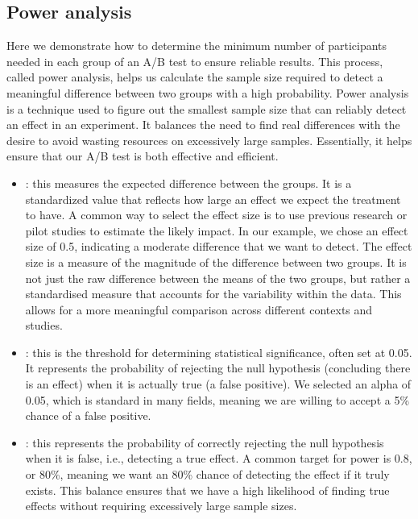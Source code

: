 \documentclass[letterpaper,10pt,english]{jupyterBook}
\begin{document}
\subsection{Power analysis}
\label{\detokenize{notebooks/AB_testing:power-analysis}}
\sphinxAtStartPar
Here we demonstrate how to determine the minimum number of participants needed in each group of an A/B test to ensure reliable results. This process, called power analysis, helps us calculate the sample size required to detect a meaningful difference between two groups with a high probability. Power analysis is a technique used to figure out the smallest sample size that can reliably detect an effect in an experiment. It balances the need to find real differences with the desire to avoid wasting resources on excessively large samples. Essentially, it helps ensure that our A/B test is both effective and efficient.

\sphinxAtStartPar
{}
\begin{itemize}
\item {} 
\sphinxAtStartPar
{}: this measures the expected difference between the groups. It is a standardized value that reflects how large an effect we expect the treatment to have. A common way to select the effect size is to use previous research or pilot studies to estimate the likely impact. In our example, we chose an effect size of 0.5, indicating a moderate difference that we want to detect. The effect size is a measure of the magnitude of the difference between two groups. It is not just the raw difference between the means of the two groups, but rather a standardised measure that accounts for the variability within the data. This allows for a more meaningful comparison across different contexts and studies.

\item {} 
\sphinxAtStartPar
{}: this is the threshold for determining statistical significance, often set at 0.05. It represents the probability of rejecting the null hypothesis (concluding there is an effect) when it is actually true (a false positive). We selected an alpha of 0.05, which is standard in many fields, meaning we are willing to accept a 5\% chance of a false positive.

\item {} 
\sphinxAtStartPar
{}: this represents the probability of correctly rejecting the null hypothesis when it is false, i.e., detecting a true effect. A common target for power is 0.8, or 80\%, meaning we want an 80\% chance of detecting the effect if it truly exists. This balance ensures that we have a high likelihood of finding true effects without requiring excessively large sample sizes.

\end{itemize}
\end{document}
